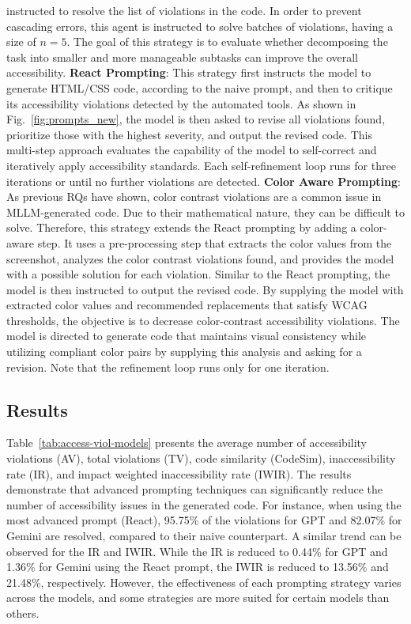   instructed to resolve the list of violations in the code. In order to 
  prevent cascading errors, this agent is instructed to solve batches 
  of violations, having a size of \(n = 5\). The goal of this strategy 
  is to evaluate whether decomposing the task into smaller and more 
  manageable subtasks can improve the overall accessibility.\newline
\noindent
\textbf{React Prompting}: 
  This strategy first instructs the model to generate HTML/CSS code, 
  according to the naive prompt, and then to critique its accessibility
  violations detected by the automated tools. As shown in 
  Fig.~\ref{fig:prompts_new}, the model is then asked to revise
  all violations found, prioritize those with the highest 
  severity, and output the revised code.
  This multi-step approach evaluates the capability of the model to 
  self-correct and iteratively apply accessibility standards. 
  Each self-refinement loop runs for three iterations or until 
  no further violations are detected.\newline
\noindent
\textbf{Color Aware Prompting}: 
  As previous RQs have shown, color contrast violations are a common 
  issue in MLLM-generated code. Due to their mathematical nature, they
  can be difficult to solve. Therefore, this strategy extends the React 
  prompting by adding a color-aware step. It uses a pre-processing 
  step that extracts the color values from the screenshot, analyzes 
  the color contrast violations found, and provides the model with a 
  possible solution for each violation. Similar to the React prompting,
  the model is then instructed to output the revised code. 
  By supplying the model with extracted color values and recommended 
  replacements that satisfy WCAG thresholds, the objective is to 
  decrease color-contrast accessibility violations. The model is 
  directed to generate code that maintains visual consistency while 
  utilizing compliant color pairs by supplying this analysis and 
  asking for a revision.
  Note that the refinement loop runs only for one iteration.\newline




\subsection{Results}
Table~\ref{tab:access-viol-models} presents the average number of accessibility 
violations (AV), total violations (TV), code similarity (CodeSim),
inaccessibility rate (IR), and impact weighted inaccessibility rate (IWIR).
The results demonstrate that advanced prompting techniques can significantly
reduce the number of accessibility issues in the generated code. For instance,
when using the most advanced prompt (React), 95.75\% of the violations for 
GPT and 82.07\% for Gemini are resolved, compared to their naive counterpart.
A similar trend can be observed for the IR and IWIR. While the 
IR is reduced to 0.44\% for GPT and 1.36\% for Gemini using the React 
prompt, the IWIR is reduced to 13.56\% and 21.48\%, respectively. However, 
the effectiveness of each prompting strategy varies across the models, and 
some strategies are more suited for certain models than others.



